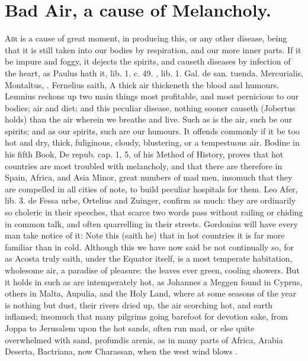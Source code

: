 {{%
\section{Bad Air, a cause of Melancholy.}

\lettrine{A}{ir} is a cause of great moment, in producing this, or any other
disease, being that it is still taken into our bodies by respiration,
and our more inner parts. If it be impure and foggy, it dejects
the spirits, and causeth diseases by infection of the heart, as Paulus
hath it, lib. 1. c. 49. \Avicenna{}, lib. 1. Gal. de san. tuenda.
Mercurialis, Montaltus, \etc{}. Fernelius saith, A thick air
thickeneth the blood and humours. Lemnius reckons up two main
things most profitable, and most pernicious to our bodies; air and
diet: and this peculiar disease, nothing sooner causeth (Jobertus
holds) than the air wherein we breathe and live. Such as is the
air, such be our spirits; and as our spirits, such are our humours. It
offends commonly if it be too hot and dry, thick, fuliginous,
cloudy, blustering, or a tempestuous air. Bodine in his fifth Book, De
repub. cap. 1, 5, of his Method of History, proves that hot countries
are most troubled with melancholy, and that there are therefore in
Spain, Africa, and Asia Minor, great numbers of mad men, insomuch that
they are compelled in all cities of note, to build peculiar hospitals
for them. Leo Afer, lib. 3. de Fessa urbe, Ortelius and Zuinger,
confirm as much: they are ordinarily so choleric in their speeches,
that scarce two words pass without railing or chiding in common talk,
and often quarrelling in their streets. Gordonius will have every
man take notice of it: Note this (saith he) that in hot countries it is
far more familiar than in cold. Although this we have now said be not
continually so, for as Acosta truly saith, under the Equator
itself, is a most temperate habitation, wholesome air, a paradise of
pleasure: the leaves ever green, cooling showers. But it holds in such
as are intemperately hot, as Johannes a Meggen found in Cyprus,
others in Malta, Aupulia, and the Holy Land, where at some
seasons of the year is nothing but dust, their rivers dried up, the air
scorching hot, and earth inflamed; insomuch that many pilgrims going
barefoot for devotion sake, from Joppa to Jerusalem upon the hot sands,
often run mad, or else quite overwhelmed with sand, profundis arenis,
as in many parts of Africa, Arabia Deserta, Bactriana, now Charassan,
when the west wind blows .

}}
